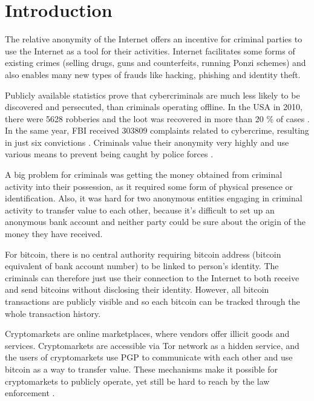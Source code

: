 \documentclass[
  digital, %
  table,   %
  lof,     %
  lot,     %
  oneside
]{fithesis3}
\begin{document}
\chapter{Introduction}

The relative anonymity of the Internet offers an incentive for criminal parties
to use the Internet as a tool for their activities.
Internet facilitates some forms of existing crimes (selling drugs, guns and
counterfeits, running Ponzi schemes) and also enables many new types of frauds like hacking, phishing and identity theft.

Publicly available statistics prove that cybercriminals are much
 less likely to be discovered and persecuted, than criminals operating offline.
 In the USA in 2010, there were 5628 robberies and the loot was recovered in more than 20 \% of cases \cite{fbi10}.
 In the same year, FBI received 303809 complaints related to cybercrime, resulting in just six convictions \cite{fbcyber}. 
Criminals value their anonymity very highly and use various means to prevent being caught by police forces \cite{tzanetakis2016transparency}\cite{van2013surfing}\cite{aldridge2014not}.

A big problem for criminals was getting the money obtained from criminal activity into their possession,
as it required some form of physical presence or identification.
Also, it was hard for two anonymous entities engaging in criminal activity to transfer value to each other,
 because it's difficult to set up an anonymous bank account and neither party could be sure about the origin of
 the money they have received.

For bitcoin, there is no central authority requiring bitcoin address
(bitcoin equivalent of bank account number) to be linked to person's identity. The criminals can therefore just use their connection to the Internet to both receive and send bitcoins without disclosing their identity.
However, all bitcoin transactions are publicly visible and so each bitcoin can be tracked through the whole transaction history.

 Cryptomarkets are online marketplaces, where vendors offer illicit goods and services.
 Cryptomarkets are accessible via Tor network as a hidden service, and the users of
 cryptomarkets use PGP to communicate with each other and use bitcoin as a way to transfer value.
These mechanisms make it possible for cryptomarkets
to publicly operate, yet still be hard to reach by the law enforcement \cite{cox2016staying}.
\end{document}
